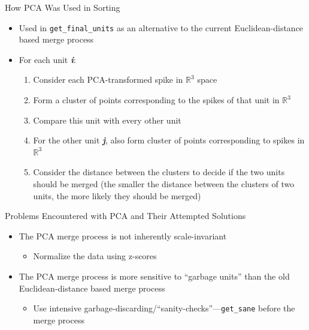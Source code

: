 \documentclass[11pt,handout]{beamer}
\begin{document}
    \begin{frame}{How PCA Was Used in Sorting}
        \begin{itemize}
            \pause
            \item Used in \texttt{get\_final\_units} as an alternative to the
current Euclidean-distance based merge process
            \pause
            \item For each unit \textbf{\emph{i}}:
            \begin{enumerate}
                \pause
                \item Consider each PCA-transformed spike in
\ensuremath{\mathbb{R}^3} space
                \pause
                \item Form a cluster of points corresponding to the spikes of that unit in
\ensuremath{\mathbb{R}^3}
                \pause
                \item Compare this unit with every other unit
                \pause
                \item For the other unit \textbf{\emph{j}}, also form 
cluster of points corresponding to spikes in \ensuremath{\mathbb{R}^3}
                \pause
                \item Consider the distance between the clusters to decide if
the two units should be merged (the smaller the distance between the clusters of
two units, the more likely they should be merged)
            \end{enumerate}
         \end{itemize}
    \end{frame}

    \begin{frame}{Problems Encountered with PCA and Their Attempted Solutions}
        \begin{itemize}
            \pause
            \item The PCA merge process is not inherently scale-invariant
            \begin{itemize}
                \pause
                \item Normalize the data using z-scores
            \end{itemize}
                \pause
            \item The PCA merge process is more sensitive to ``garbage units''
than the old Euclidean-distance based merge process
            \begin{itemize}
                \pause
                \item Use intensive
garbage-discarding/``sanity-checks''---\texttt{get\_sane} before the merge
process
            \end{itemize}
        \end{itemize}
    \end{frame}
    
\end{document}
